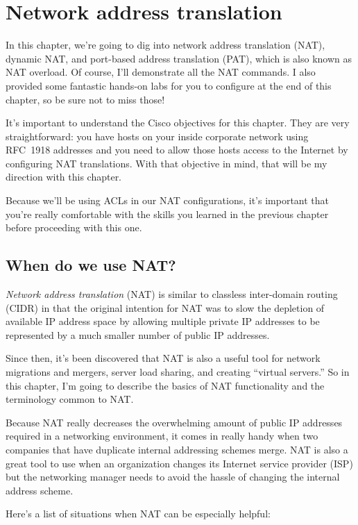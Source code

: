 \chapter{Network address translation}
\label{chap:nat}

In this chapter, we're going to dig into network address translation (NAT), dynamic NAT, and port-based address translation (PAT), which is also known as NAT overload.
Of course, I'll demonstrate all the NAT commands.
I also provided some fantastic hands-on labs for you to configure at the end of this chapter, so be sure not to miss those!

It's important to understand the Cisco objectives for this chapter. They are very straightforward: you have hosts on your inside corporate
network using RFC~1918 addresses and you need to allow those hosts access to the Internet by configuring NAT translations. With that
objective in mind, that will be my direction with this chapter.

Because we'll be using ACLs in our NAT configurations, it's important
that you're really comfortable with the skills you learned in the
previous chapter before proceeding with this one.

\section{When do we use NAT?}

\emph{Network address translation} (NAT) is similar to classless inter-domain routing (CIDR) in that the original intention for NAT was to slow
the depletion of available IP address space by allowing multiple
private IP addresses to be represented by a much smaller number of public IP addresses.

Since then, it's been discovered that NAT is also a useful tool for network migrations and mergers, server load sharing, and creating
``virtual servers.''
So in this chapter, I'm going to describe the basics of NAT functionality and the terminology common to NAT.

Because NAT really decreases the overwhelming amount of public IP addresses required in a networking environment, it comes in really handy
when two companies that have duplicate internal addressing schemes merge. NAT is also a great tool to use when an organization changes its
Internet service provider (ISP) but the networking manager needs to avoid the hassle of changing the internal address scheme.

Here's a list of situations when NAT can be especially helpful:

